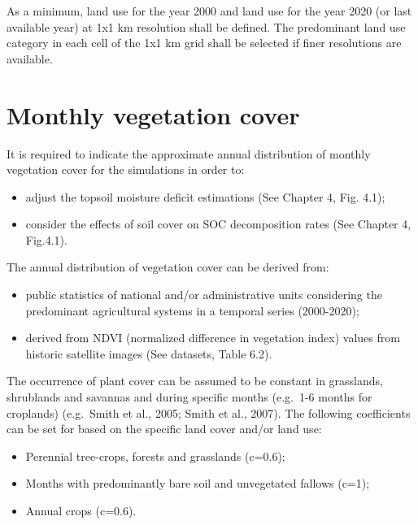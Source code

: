 \documentclass[
  10pt,
  b5paper,
]{book}
\providecommand{\tightlist}{%
  \setlength{\itemsep}{0pt}\setlength{\parskip}{0pt}}
\begin{document}
As a minimum, land use for the year 2000 and land use for the year 2020 (or last available year) at 1x1 km resolution shall be defined. The predominant land use category in each cell of the 1x1 km grid shall be selected if finer resolutions are available.

\hypertarget{monthly-vegetation-cover}{%
\section{Monthly vegetation cover}\label{monthly-vegetation-cover}}

It is required to indicate the approximate annual distribution of monthly vegetation cover for the simulations in order to:

\begin{itemize}
\tightlist
\item
  adjust the topsoil moisture deficit estimations (See Chapter 4, Fig. 4.1);
\item
  consider the effects of soil cover on SOC decomposition rates (See Chapter 4, Fig.4.1).
\end{itemize}

The annual distribution of vegetation cover can be derived from:

\begin{itemize}
\tightlist
\item
  public statistics of national and/or administrative units considering the predominant agricultural systems in a temporal series (2000-2020);
\item
  derived from NDVI (normalized difference in vegetation index) values from historic satellite images (See datasets, Table 6.2).
\end{itemize}

The occurrence of plant cover can be assumed to be constant in grasslands, shrublands and savannas and during specific months (e.g.~1-6 months for croplands) (e.g.~Smith et al., 2005; Smith et al., 2007). The following coefficients can be set for based on the specific land cover and/or land use:

\begin{itemize}
\tightlist
\item
  Perennial tree-crops, forests and grasslands (c=0.6);
\item
  Months with predominantly bare soil and unvegetated fallows (c=1);
\item
  Annual crops (c=0.6).
\end{itemize}
\end{document}
